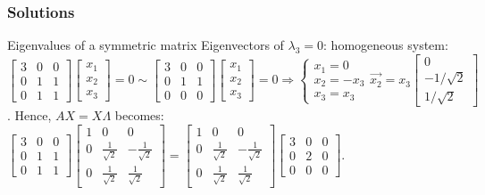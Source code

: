 \begin{frame}
	\frametitle{Solutions}
	\begin{block}{Eigenvalues of a symmetric matrix}
		Eigenvectors of $\lambda_3=0$: homogeneous system:\\
		$\begin{bmatrix}
		3 & 0& 0\\
		0 & 1 & 1\\
		0 & 1 & 1
		\end{bmatrix}\begin{bmatrix}
		x_1\\x_2\\x_3
		\end{bmatrix}=0 \sim \begin{bmatrix}
		3 & 0& 0\\
		0 & 1 & 1\\
		0 & 0 & 0
		\end{bmatrix}\begin{bmatrix}
		x_1\\x_2\\x_3
		\end{bmatrix}=0 \Rightarrow \begin{cases}
		x_1=0\\x_2=-x_3\\x_3=x_3
		\end{cases} \overrightarrow{x_2}=x_3\begin{bmatrix}
		0\\-1/\sqrt{2}\\1/\sqrt{2}
		\end{bmatrix}$. Hence, $AX=X\Lambda$ becomes: \\
		$\begin{bmatrix}
		3 & 0& 0\\
		0 & 1 & 1\\
		0 & 1 & 1
		\end{bmatrix}\begin{bmatrix}
		1 & 0 & 0\\
		0 & \frac{1}{\sqrt{2}} & -\frac{1}{\sqrt{2}}\\
		0 & \frac{1}{\sqrt{2}} & \frac{1}{\sqrt{2}}
		\end{bmatrix}=\begin{bmatrix}
		1 & 0 & 0\\
		0 & \frac{1}{\sqrt{2}} &-\frac{1}{\sqrt{2}}\\
		0 & \frac{1}{\sqrt{2}} & \frac{1}{\sqrt{2}}
		\end{bmatrix} \begin{bmatrix}
		3 & 0 & 0\\
		0 & 2 & 0\\
		0 & 0 & 0
		\end{bmatrix}$.
	\end{block}
\end{frame}

